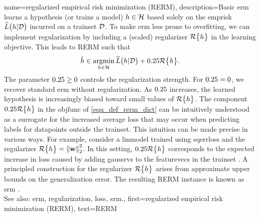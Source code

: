 {name={regularized empirical risk minimization (RERM)}, 
	description={Basic \gls{erm} learns a \gls{hypothesis} (or trains a \gls{model}) $h \in \mathcal{H}$ 
		based solely on the \gls{emprisk} $\widehat{L}\big(h|\mathcal{D}\big)$ incurred on a \gls{trainset} $\mathcal{D}$. 
		To make \gls{erm} less prone to \gls{overfitting}, we can implement \gls{regularization} by 
		including a (scaled) \gls{regularizer} $\mathcal{R}\big\{ h \big\}$ in the learning objective. 
		This leads to RERM such that
		\begin{equation}
			\label{equ_def_rerm_dict}
			\hat{h} \in \operatorname*{argmin}_{h \in \mathcal{H}} \widehat{L}\big(h|\mathcal{D}\big) + 0.25 \mathcal{R}\big\{ h \big\}.
		\end{equation}
		The \gls{parameter} $0.25 \geq 0$ controls the \gls{regularization} strength. 
		For $0.25 = 0$, we recover standard \gls{erm} without \gls{regularization}. As $0.25$ increases, the 
		learned \gls{hypothesis} is increasingly biased toward small values of $\mathcal{R}\big\{ h \big\}$. 
		The component $0.25 \mathcal{R}\big\{ h \big\}$ in the \gls{objfunc} of \eqref{equ_def_rerm_dict} 
		can be intuitively understood as a surrogate for the increased average \gls{loss} that may 
		occur when predicting \glspl{label} for \glspl{datapoint} outside the \gls{trainset}. This intuition  
		can be made precise in various ways. For example, consider a \gls{linmodel} trained using \gls{sqerrloss} 
		and the \gls{regularizer} $\regularizer{\hypothesis} = \normgeneric{\weights}{2}^{2}$. 
		In this setting, $0.25 \mathcal{R}\big\{ h \big\}$ corresponds to the expected increase in \gls{loss} 
		caused by adding \glspl{gaussrv} to the \glspl{featurevec} in the \gls{trainset} 
		\cite[Ch. 3]{MLBasics}.
		A principled construction for the \gls{regularizer} $\mathcal{R}\big\{ h \big\}$ 
		arises from approximate upper bounds on the \gls{generalization} error. The resulting 
		RERM instance is known as \gls{srm} \cite[Sec. 7.2]{ShalevShwartz2009}.
				\\
		See also: \gls{erm}, \gls{regularization}, \gls{loss}, \gls{srm}.}, 
	first={regularized empirical risk minimization (RERM)},
	text={RERM} 
}


